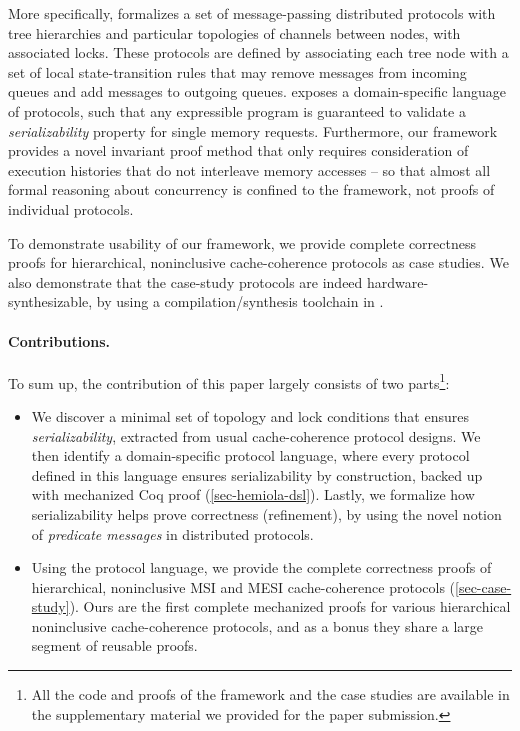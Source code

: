 \documentclass[sigplan,10pt,review,anonymous,screen]{acmart}\settopmatter{printfolios=true,printccs=false,printacmref=false}
\begin{document}
More specifically, \hemiola{} formalizes a set of message-passing distributed protocols with tree hierarchies and particular topologies of channels between nodes, with associated locks.
These protocols are defined by associating each tree node with a set of local state-transition rules that may remove messages from incoming queues and add messages to outgoing queues.
\hemiola{} exposes a domain-specific language of protocols, such that any expressible program is guaranteed to validate a \emph{serializability} property for single memory requests.
Furthermore, our framework provides a novel invariant proof method that only requires consideration of execution histories that do not interleave memory accesses -- so that almost all formal reasoning about concurrency is confined to the framework, not proofs of individual protocols.

To demonstrate usability of our framework, we provide complete correctness proofs for hierarchical, noninclusive cache-coherence protocols as case studies.
We also demonstrate that the case-study protocols are indeed hardware-synthesizable, by using a compilation/synthesis toolchain in \hemiola{}.

\paragraph{Contributions.}
To sum up, the contribution of this paper largely consists of two parts\footnote{All the code and proofs of the framework and the case studies are available in the supplementary material we provided for the paper submission.}:
\begin{itemize}
\item We discover a minimal set of topology and lock conditions that ensures \emph{serializability}, extracted from usual cache-coherence protocol designs. We then identify a domain-specific protocol language, where every protocol defined in this language ensures serializability by construction, backed up with mechanized Coq proof (\autoref{sec-hemiola-dsl}). Lastly, we formalize how serializability helps prove correctness (refinement), by using the novel notion of \emph{predicate messages} in distributed protocols.
\item Using the protocol language, we provide the complete correctness proofs of hierarchical, noninclusive MSI and MESI cache-coherence protocols (\autoref{sec-case-study}). Ours are the first complete mechanized proofs for various hierarchical noninclusive cache-coherence protocols, and as a bonus they share a large segment of reusable proofs.
\end{itemize}
\end{document}
